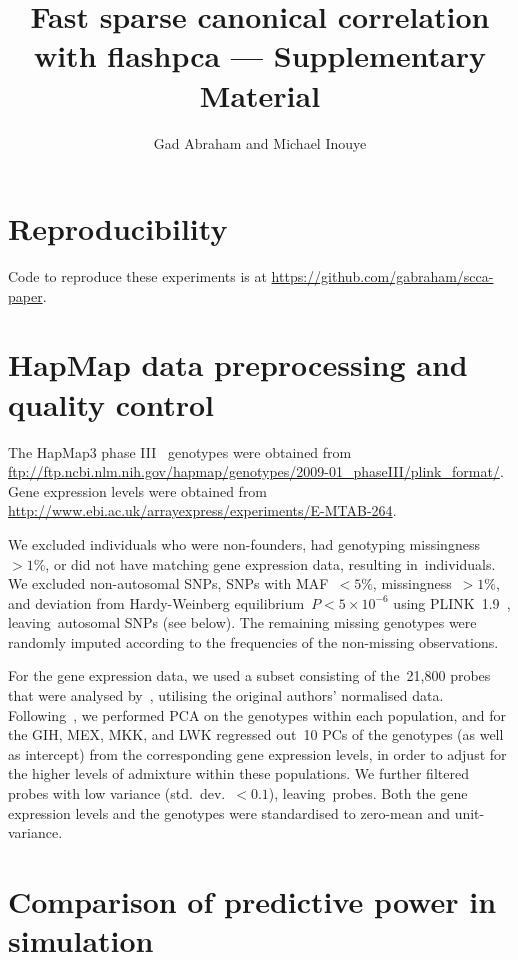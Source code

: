 \documentclass[a4paper,12pt]{article}
\author{Gad Abraham and Michael Inouye}
\title{Fast sparse canonical correlation with flashpca --- Supplementary
Material}
\begin{document}
\maketitle

\section{Reproducibility}

Code to reproduce these experiments is at
\url{https://github.com/gabraham/scca-paper}.

\section{HapMap data preprocessing and quality control}

The HapMap3 phase III~\citep{hapmap2010} genotypes were obtained from
\url{ftp://ftp.ncbi.nlm.nih.gov/hapmap/genotypes/2009-01_phaseIII/plink_format/}.
Gene expression levels were obtained from
\url{http://www.ebi.ac.uk/arrayexpress/experiments/E-MTAB-264}.

We excluded individuals who were non-founders, had genotyping
missingness~${>}1\%$, or did not have matching gene expression data,
resulting in~\nindiv individuals. We excluded non-autosomal SNPs, SNPs
with MAF~${<}5\%$, missingness~${>}1\%$, and deviation from Hardy-Weinberg
equilibrium~$P{<}5\times10^{-6}$ using PLINK~1.9~\citep{purcell2007,Chang2015},
leaving~\nsnps autosomal SNPs (see below). The remaining missing genotypes were
randomly imputed according to the frequencies of the non-missing observations.

For the gene expression data, we used a subset consisting of the~21,800 probes
that were analysed by~\citep{Stranger2012}, utilising the original authors'
normalised data. Following~\citep{Stranger2012}, we performed PCA on the
genotypes within each population, and for the GIH, MEX, MKK, and LWK regressed
out~10 PCs of the genotypes (as well as intercept) from the corresponding gene
expression levels, in order to adjust for the higher levels of admixture within
these populations.  We further filtered probes with low variance
(std.~dev.~${<}0.1$), leaving~\ngenes probes. Both the gene expression levels and
the genotypes were standardised to zero-mean and unit-variance.

\section{Comparison of predictive power in simulation}
\end{document}
